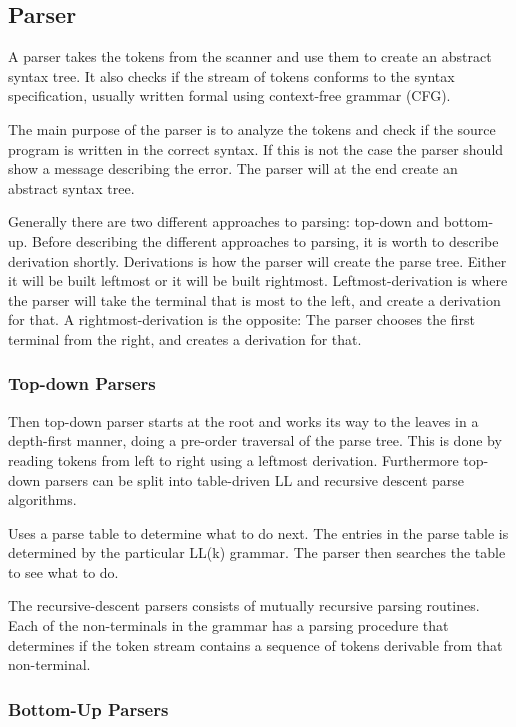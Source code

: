 \subsection{Parser}
A parser takes the tokens from the scanner and use them to create an abstract syntax tree. It also checks if the stream of tokens conforms to the syntax specification, usually written formal using context-free grammar (CFG).

The main purpose of the parser is to analyze the tokens and check if the source program is written in the correct syntax. If this is not the case the parser should show a message describing the error. The parser will at the end create an abstract syntax tree. 

Generally there are two different approaches to parsing: top-down and bottom-up. Before describing the different approaches to parsing, it is worth to describe derivation shortly. Derivations is how the parser will create the parse tree. Either it will be built leftmost or it will be built rightmost. Leftmost-derivation is where the parser will take the terminal that is most to the left, and create a derivation for that. A rightmost-derivation is the opposite: The parser chooses the first terminal from the right, and creates a derivation for that. 

\subsubsection{Top-down Parsers}
Then top-down parser starts at the root and works its way to the leaves in a depth-first manner, doing a pre-order traversal of the parse tree. This is done by reading tokens from left to right using a leftmost derivation. Furthermore top-down parsers can be split into table-driven LL and recursive descent parse algorithms.

Uses a parse table to determine what to do next. The entries in the parse table is determined by the particular LL(k) grammar. The parser then searches the table to see what to do.

The recursive-descent parsers consists of mutually recursive parsing routines. Each of the non-terminals in the grammar has a parsing procedure that determines if the token stream contains a sequence of tokens derivable from that non-terminal.

\subsubsection{Bottom-Up Parsers}

